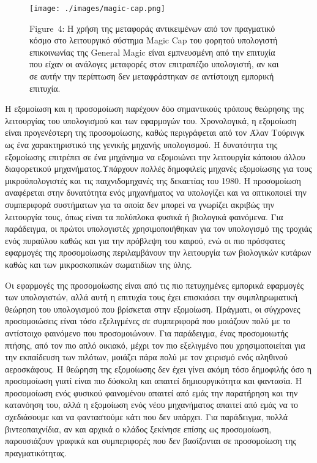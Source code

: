 \documentclass[
]{article}
\begin{document}
\leavevmode{}%
\begin{figure}
\hypertarget{fig:magic-cap}{%
\centering
\texttt{[image: ./images/magic-cap.png]}
\caption{Figure~4: Η χρήση της μεταφοράς αντικειμένων από τον πραγματικό
κόσμο στο λειτουργικό σύστημα Magic Cap του φορητού υπολογιστή
επικοινωνίας της General Magic είναι εμπνευσμένη από την επιτυχία που
είχαν οι ανάλογες μεταφορές στον επιτραπέζιο υπολογιστή, αν και σε αυτήν
την περίπτωση δεν μεταφράστηκαν σε αντίστοιχη εμπορική
επιτυχία.}\label{fig:magic-cap}
}
\end{figure}

Η εξομοίωση και η προσομοίωση παρέχουν δύο σημαντικούς τρόπους θεώρησης
της λειτουργίας του υπολογισμού και των εφαρμογών του. Χρονολογικά, η
εξομοίωση είναι προγενέστερη της προσομοίωσης, καθώς περιγράφεται από
τον Άλαν Τούρινγκ ως ένα χαρακτηριστικό της γενικής μηχανής υπολογισμού.
Η δυνατότητα της εξομοίωσης επιτρέπει σε ένα μηχάνημα να εξομοιώνει την
λειτουργία κάποιου άλλου διαφορετικού μηχανήματος.Υπάρχουν πολλές
δημοφιλείς μηχανές εξομοίωσης για τους μικροϋπολογιστές και τις
παιχνιδομηχανές της δεκαετίας του 1980. Η προσομοίωση αναφέρεται στην
δυνατότητα ενός μηχανήματος να υπολογίζει και να οπτικοποιεί την
συμπεριφορά συστήματων για τα οποία δεν μπορεί να γνωρίζει ακριβώς την
λειτουργία τους, όπως είναι τα πολύπλοκα φυσικά ή βιολογικά φαινόμενα.
Για παράδειγμα, οι πρώτοι υπολογιστές χρησιμοποιήθηκαν για τον
υπολογισμό της τροχιάς ενός πυραύλου καθώς και για την πρόβλεψη του
καιρού, ενώ οι πιο πρόσφατες εφαρμογές της προσομοίωσης περιλαμβάνουν
την λειτουργία των βιολογικών κυτάρων καθώς και των μικροσκοπικών
σωματιδίων της ύλης.

Οι εφαρμογές της προσομοίωσης είναι από τις πιο πετυχημένες εμπορικά
εφαρμογές των υπολογιστών, αλλά αυτή η επιτυχία τους έχει επισκιάσει την
συμπληρωματική θεώρηση του υπολογισμού που βρίσκεται στην εξομοίωση.
Πράγματι, οι σύγχρονες προσομοιώσεις είναι τόσο εξελιγμένες σε
συμπεριφορά που μοιάζουν πολύ με το αντίστοιχο φαινόμενο που
προσομοιώνουν. Για παράδειγμα, ένας προσομοιωτής πτήσης, από τον πιο
απλό οικιακό, μέχρι τον πιο εξελιγμένο που χρησιμοποιείται για την
εκπαίδευση των πιλότων, μοιάζει πάρα πολύ με τον χειρισμό ενός αληθινού
αεροσκάφους. H θεώρηση της εξομοίωσης δεν έχει γίνει ακόμη τόσο
δημοφιλής όσο η προσομοίωση γιατί είναι πιο δύσκολη και απαιτεί
δημιουργικότητα και φαντασία. Η προσομοίωση ενός φυσικού φαινομένου
απαιτεί από εμάς την παρατήρηση και την κατανόηση του, αλλά η εξομοίωση
ενός νέου μηχανήματος απαιτεί από εμάς να το σχεδιάσουμε και να
φανταστούμε κάτι που δεν υπάρχει. Για παράδειγμα, πολλά βιντεοπαιχνίδια,
αν και αρχικά ο κλάδος ξεκίνησε επίσης ως προσομοίωση, παρουσιάζουν
γραφικά και συμπεριφορές που δεν βασίζονται σε προσομοίωση της
πραγματικότητας.
\end{document}
